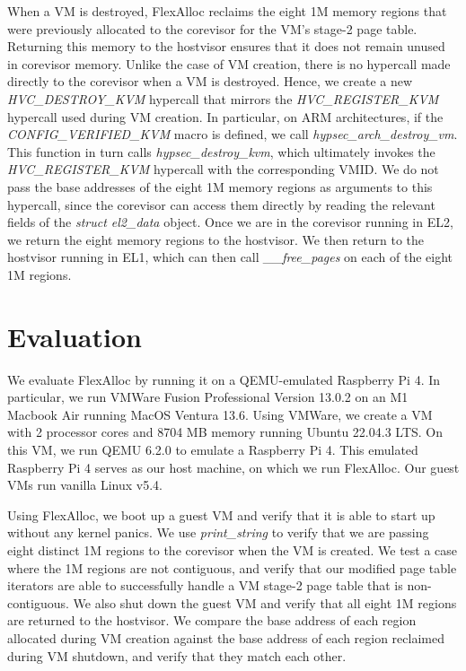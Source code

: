 When a VM is destroyed, FlexAlloc reclaims the eight 1M memory regions that were
previously allocated to the corevisor for the VM's stage-2 page table. Returning
this memory to the hostvisor ensures that it does not remain unused in corevisor
memory. Unlike the case of VM creation, there is no hypercall made directly to
the corevisor when a VM is destroyed. Hence, we create a new \textit{HVC\_DESTROY\_KVM}
hypercall that mirrors the \textit{HVC\_REGISTER\_KVM} hypercall used during VM
creation. In particular, on ARM architectures, if the \textit{CONFIG\_VERIFIED\_KVM} macro is defined,
we call \textit{hypsec\_arch\_destroy\_vm}. This function in turn calls \textit{hypsec\_destroy\_kvm},
which ultimately invokes the \textit{HVC\_REGISTER\_KVM} hypercall with the corresponding
VMID. We do not pass the base addresses of the eight 1M memory regions as arguments
to this hypercall, since the corevisor can access them directly by reading the
relevant fields of the \textit{struct el2\_data} object. Once we are in the
corevisor running in EL2, we return the eight memory regions to the hostvisor.
We then return to the hostvisor running in EL1, which can then call \textit{\_\_free\_pages}
on each of the eight 1M regions.

\section{Evaluation}

We evaluate FlexAlloc by running it on a QEMU-emulated Raspberry Pi 4. In
particular, we run VMWare Fusion Professional Version 13.0.2 on an M1 Macbook
Air running MacOS Ventura 13.6. Using VMWare, we create a VM
with 2 processor cores and 8704 MB memory running Ubuntu 22.04.3 LTS. On this
VM, we run QEMU 6.2.0 to emulate a Raspberry Pi 4. This emulated Raspberry
Pi 4 serves as our host machine, on which we run FlexAlloc. Our guest VMs
run vanilla Linux v5.4.

Using FlexAlloc, we boot up a guest VM and verify that it is able to start up
without any kernel panics. We use \textit{print\_string} to verify that we
are passing eight distinct 1M regions to the corevisor when the VM is created.
We test a case where the 1M regions are not contiguous, and verify that our
modified page table iterators are able to successfully handle a VM stage-2 page
table that is non-contiguous. We also shut down the guest VM and verify that
all eight 1M regions are returned to the hostvisor. We compare the base address
of each region allocated during VM creation against the base address of each
region reclaimed during VM shutdown, and verify that they match each other.

